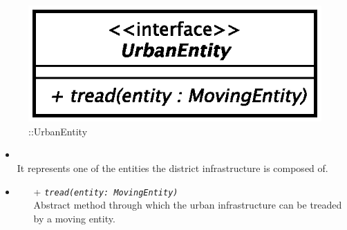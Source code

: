 \begin{figure}[h]
\centering
\includegraphics[scale=0.6,keepaspectratio]{images/solution/app/backend/urban_entity.eps}
\caption{\pReactiveComponent::UrbanEntity}
\label{fig:sd-app-urban-entity}
\end{figure}
\FloatBarrier
\begin{itemize}
  \item \textbf{\descr} \\
    It represents one of the entities the district infrastructure is composed
    of.
  \item \textbf{\ops}
  \begin{itemize} 
    \item[+] \texttt{\textit{tread(entity: MovingEntity)}} \\
    Abstract method through which the urban infrastructure can be treaded by a
    moving entity.
  \end{itemize}
\end{itemize}
